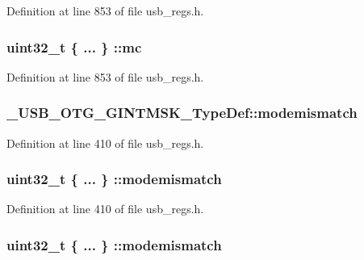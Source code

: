 Definition at line 853 of file usb\-\_\-regs.\-h.

\hypertarget{group___u_s_b___o_t_g___d_r_i_v_e_r_ga8f6730625458abaee96f9b92843965e6}{
\subsubsection[{mc}]{\setlength{\rightskip}{0pt plus 5cm}uint32\-\_\-t \{ ... \} \-::mc}}\label{group___u_s_b___o_t_g___d_r_i_v_e_r_ga8f6730625458abaee96f9b92843965e6}


Definition at line 853 of file usb\-\_\-regs.\-h.

\hypertarget{group___u_s_b___o_t_g___d_r_i_v_e_r_ga77714304af3ece5bbc8fcd3ba715adc9}{
\subsubsection[{modemismatch}]{ \-\_\-\-U\-S\-B\-\_\-\-O\-T\-G\-\_\-\-G\-I\-N\-T\-M\-S\-K\-\_\-\-Type\-Def\-::modemismatch}}\label{group___u_s_b___o_t_g___d_r_i_v_e_r_ga77714304af3ece5bbc8fcd3ba715adc9}


Definition at line 410 of file usb\-\_\-regs.\-h.

\hypertarget{group___u_s_b___o_t_g___d_r_i_v_e_r_ga43f597f947b0992b22243a8a7b47b923}{
\subsubsection[{modemismatch}]{\setlength{\rightskip}{0pt plus 5cm}uint32\-\_\-t \{ ... \} \-::modemismatch}}\label{group___u_s_b___o_t_g___d_r_i_v_e_r_ga43f597f947b0992b22243a8a7b47b923}


Definition at line 410 of file usb\-\_\-regs.\-h.

\hypertarget{group___u_s_b___o_t_g___d_r_i_v_e_r_ga2221072c10a29e522eae85e237fdc7ee}{
\subsubsection[{modemismatch}]{\setlength{\rightskip}{0pt plus 5cm}uint32\-\_\-t \{ ... \} \-::modemismatch}}\label{group___u_s_b___o_t_g___d_r_i_v_e_r_ga2221072c10a29e522eae85e237fdc7ee}


